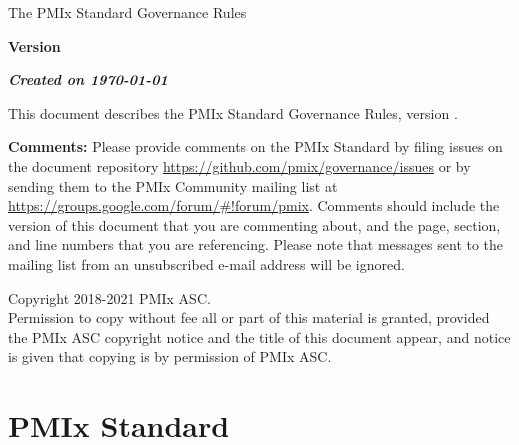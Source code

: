 \documentclass{article}
\newcommand{\VERDATE}{\emph{Created on \today}}
\newcommand{\VERDATE}{MONTH DAY, YEAR}
\begin{document}
\thispagestyle{empty}

\begin{titlepage}

\begin{center}
  \Huge \textsf{The PMIx Standard Governance Rules}

  \vspace{1.0in}

  \huge \textbf{Version \VER{}}

  \vspace{0.15in}

  \Large \textbf{\VERDATE}

\end{center}

\vspace{1.2in}

\vfill

\par
This document describes the PMIx Standard Governance Rules, version \VER{}.

\vspace{1em}

\textbf{Comments:}
Please provide comments on the PMIx Standard by filing issues on the document repository \url{https://github.com/pmix/governance/issues} or by sending them to the PMIx Community mailing list at \url{https://groups.google.com/forum/#!forum/pmix}.
Comments should include the version of this document that you are commenting about, and the page, section, and line numbers that you are referencing.
Please note that messages sent to the mailing list from an unsubscribed e-mail address will be ignored.

\vspace{1em}

Copyright\textsuperscript{\textcopyright} 2018-2021 PMIx \acf{ASC}.\\
Permission to copy without fee all or part of this material is granted,
provided the PMIx \ac{ASC} copyright notice and
the title of this document appear, and notice is given that copying is by
permission of PMIx \ac{ASC}.

\end{titlepage}

\newpage

\tableofcontents
\newpage

\hypertarget{pmix-standard}{%
\section{PMIx Standard}%
\label{pmix-standard}}
\end{document}
